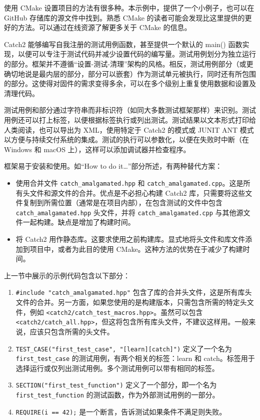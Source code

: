 \begin{myNotic}
使用 CMake 设置项目的方法有很多种。本示例中，提供了一个小例子，也可以在 GitHub 存储库的源文件中找到。熟悉 CMake 的读者可能会发现比这里提供的更好的方法。可以通过在线资源了解更多关于 CMake 的信息。
\end{myNotic}


Catch2 能够编写自我注册的测试用例函数，甚至提供一个默认的 main() 函数实现，以便可以专注于测试代码并减少设置代码的编写量。测试用例划分为独立运行的部分。框架并不遵循“设置-测试-清理”架构的风格。相反，测试用例部分（或更确切地说是最内层的部分，部分可以嵌套）作为测试单元被执行，同时还有所包围的部分。这使得对固件的需求变得多余，可以在多个级别上重复使用数据和设置及清理代码。

测试用例和部分通过字符串而非标识符（如同大多数测试框架那样）来识别。测试用例还可以打上标签，以便根据标签执行或列出测试。测试结果以文本形式打印给人类阅读，也可以导出为 XML，使用特定于 Catch2 的模式或 JUNIT ANT 模式以方便与持续交付系统的集成。测试的执行可以参数化，以便在失败时中断（在 Windows 和 macOS 上），这样可以添加调试器并检查程序。

框架易于安装和使用。如“How to do it…”部分所述，有两种替代方案：

\begin{itemize}
\item
使用合并文件 \verb|catch_amalgamated.hpp| 和 \verb|catch_amalgamated.cpp|。这是所有头文件和源文件的合并。优点是不必担心构建 Catch2 库，只需要将这些文件复制到所需位置（通常是在项目内部），在包含测试的文件中包含 \verb|catch_amalgamated.hpp| 头文件，并将 \verb|catch_amalgamated.cpp| 与其他源文件一起构建。缺点是增加了构建时间。

\item
将 Catch2 用作静态库。这要求使用之前构建库。显式地将头文件和库文件添加到项目中，或者为此目的使用 CMake。这种方法的优势在于减少了构建时间。
\end{itemize}

上一节中展示的示例代码包含以下部分：

\begin{enumerate}
\item
\verb|#include "catch_amalgamated.hpp"| 包含了库的合并头文件，这是所有库头文件的合并。另一方面，如果您使用的是构建版本，只需包含所需的特定头文件，例如 \verb|<catch2/catch_test_macros.hpp>|。虽然可以包含 \verb|<catch2/catch_all.hpp>|，但这将包含所有库头文件，不建议这样用。一般来说，应该只包含所需的头文件。

\item
\verb|TEST_CASE("first_test_case", "[learn][catch]")| 定义了一个名为 \verb|first_test_case| 的测试用例，有两个相关的标签：learn 和 catch。标签用于选择运行或仅列出测试用例。多个测试用例可以带有相同的标签。

\item
\verb|SECTION("first_test_function")| 定义了一个部分，即一个名为 \verb|first_test_function| 的测试函数，作为外部测试用例的一部分。

\item
\verb|REQUIRE(i == 42);| 是一个断言，告诉测试如果条件不满足则失败。
\end{enumerate}

